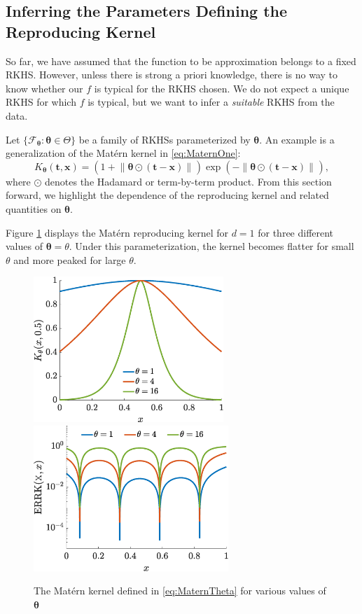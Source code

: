 \documentclass[]{mcom-l}
\theoremstyle{theorem}
\theoremstyle{remark}
\newcommand{\bx}{{\boldsymbol{x}}}
\newcommand{\bt}{{\boldsymbol{t}}}
\newcommand{\btheta}{{\boldsymbol{\theta}}}
\newcommand{\calf}{{\mathcal{F}}}
\newcommand{\norm}[2][{}]{\ensuremath{\left \lVert #2 \right \rVert}_{#1}}
\begin{document}
\subsection{Inferring the Parameters Defining the Reproducing Kernel} \label{sec:adaptTheta}

So far, we have assumed that the function to be approximation belongs to a fixed RKHS.  However, unless there is strong a priori knowledge, there is no way to know whether our $f$ is typical for  the RKHS chosen.  We do not expect a unique RKHS for which $f$ is typical, but we want to infer a \emph{suitable} RKHS from the data.  

Let $\{\calf_{\btheta} : \btheta \in \Theta\}$ be a family of RKHSs parameterized by $\btheta$.  An example is a generalization of the Mat\'ern kernel  in \eqref{eq:MaternOne}:
\begin{equation} \label{eq:MaternTheta}
K_\btheta(\bt,\bx) = (1 +  \norm{\btheta \odot (\bt-\bx)}) \exp(-\norm{\btheta \odot (\bt-\bx)}),
\end{equation}
where $\odot$ denotes the Hadamard or term-by-term product.  From this section forward, we highlight the dependence of the reproducing kernel and related quantities on $\btheta$.

Figure \ref{fig:MaternThPlot} displays the Mat\'ern reproducing kernel for $d=1$ for three different values of $\btheta = \theta$.  Under this parameterization, the kernel becomes flatter for small $\theta$ and more peaked for large $\theta$.  

\begin{figure}[H]
	\centering
	\includegraphics[height = 5.5cm]{ProgramsImages/KthetaPlot.eps} \qquad
	\includegraphics[height = 5.5cm]{ProgramsImages/errKplotth.eps}
	\caption{The Mat\'ern kernel defined in \eqref{eq:MaternTheta} for various values of $\btheta$ \label{fig:MaternThPlot}}
\end{figure}
\end{document}
